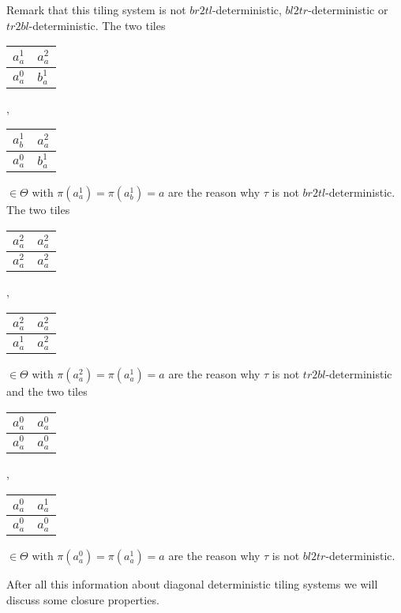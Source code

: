 Remark that this tiling system is not $br2tl$-deterministic, $bl2tr$-deterministic or
$tr2bl$-deterministic. The two tiles \begin{tabular}{|C{0.8cm}|C{0.8cm}|}
\hline
 $a_{a}^1$ & $a_{a}^2$ \tabularnewline
\hline
 $a_{a}^0$ & $b_{a}^1$ \tabularnewline
\hline
\end{tabular}, 
\begin{tabular}{|C{0.8cm}|C{0.8cm}|}
\hline
 $a_{b}^1$ & $a_{a}^2$ \tabularnewline
\hline
 $a_{a}^0$ & $b_{a}^1$ \tabularnewline
\hline
\end{tabular} $\in \Theta$ with $\pi(a_{a}^1) = \pi(a_{b}^1) = a$ are the reason why $\tau$ is not
$br2tl$-deterministic. The two tiles \begin{tabular}{|C{0.8cm}|C{0.8cm}|}
\hline
 $a_{a}^2$ & $a_{a}^2$ \tabularnewline
\hline
 $a_{a}^2$ & $a_{a}^2$ \tabularnewline
\hline
\end{tabular}, 
\begin{tabular}{|C{0.8cm}|C{0.8cm}|}
\hline
 $a_{a}^2$ & $a_{a}^2$ \tabularnewline
\hline
 $a_{a}^1$ & $a_{a}^2$ \tabularnewline
\hline
\end{tabular} $\in \Theta$ with $\pi(a_{a}^2) = \pi(a_{a}^1) = a$ are the reason why $\tau$ is not
$tr2bl$-deterministic and the two tiles 
\begin{tabular}{|C{0.8cm}|C{0.8cm}|}
\hline
 $a_{a}^0$ & $a_{a}^0$ \tabularnewline
\hline
 $a_{a}^0$ & $a_{a}^0$ \tabularnewline
\hline
\end{tabular}, 
\begin{tabular}{|C{0.8cm}|C{0.8cm}|}
\hline
 $a_{a}^0$ & $a_{a}^1$ \tabularnewline
\hline
 $a_{a}^0$ & $a_{a}^0$ \tabularnewline
\hline
\end{tabular} $\in \Theta$ with $\pi(a_{a}^0) = \pi(a_{a}^1) = a$ are the reason why $\tau$ is not
$bl2tr$-deterministic.
 
 \vspace{0.5cm}
After all this information about diagonal deterministic tiling systems we will discuss some closure
properties.
\label{diag_drec}